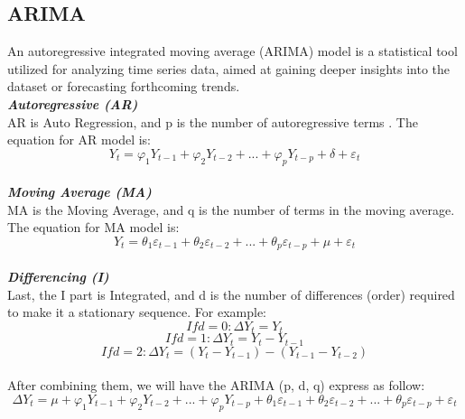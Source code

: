 \documentclass{ieeeojies}
\begin{document}
 \subsection{ARIMA} 
An autoregressive integrated moving average (ARIMA) model is a statistical tool utilized for analyzing time series data, aimed at gaining deeper insights into the dataset or forecasting forthcoming trends. \cite{b8}
\\
\textit{\textbf{Autoregressive (AR)}}
\\
AR is Auto Regression, and p is the number of autoregressive terms . The equation for AR model is: 
\[Y_t = \varphi_1Y_{t-1} + \varphi_2Y_{t-2} + ... + \varphi_pY_{t-p} + \delta + \varepsilon_t\]
\\
\textit{\textbf{Moving Average (MA)}}
\\
MA is the Moving Average, and q is the number of terms in the moving average. The equation for MA model is:  
\[Y_t = \theta_1\varepsilon_{t-1} + \theta_2\varepsilon_{t-2} + ... + \theta_p\varepsilon_{t-p} + \mu + \varepsilon_t\]
\\
\textit{\textbf{Differencing (I) }}
\\
Last, the I part is Integrated, and d is the number of differences (order) required to make it a stationary sequence. For example:
\[If d=0: \Delta Y_t=Y_t\]
\[If d=1: \Delta Y_t=Y_t - Y_{t-1}\]
\[If d=2: \Delta Y_t=\left(Y_t - Y_{t-1}\right) - \left(Y_{t-1} - Y_{t-2}\right)\]
\\
After combining them, we will have the ARIMA (p, d, q) express as follow:
\[\Delta Y_t = \mu + \varphi_1Y_{t-1} + \varphi_2Y_{t-2} + ... + \varphi_pY_{t-p}+ \theta_1\varepsilon_{t-1} + \theta_2\varepsilon_{t-2} + ... + \theta_p\varepsilon_{t-p} + \varepsilon_t\]
\end{document}
